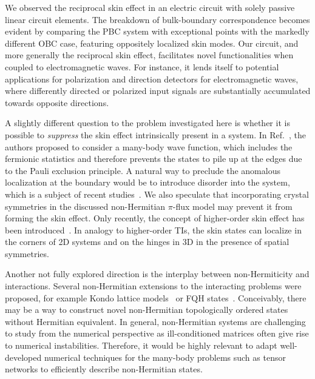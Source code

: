 We observed the reciprocal skin effect in an electric circuit with solely passive linear circuit elements. The breakdown of bulk-boundary correspondence becomes evident by comparing the PBC system with exceptional points with the markedly different OBC case, featuring oppositely localized skin modes. Our circuit, and more generally the reciprocal skin effect, facilitates novel functionalities when coupled to electromagnetic waves. For instance, it lends itself to potential applications for polarization and direction detectors for electromagnetic waves, where differently directed or polarized input signals are substantially accumulated towards opposite directions.

A slightly different question to the problem investigated here is whether it is possible to \emph{suppress} the skin effect intrinsically present in a system. In Ref.~\cite{PhysRevB.101.121109}, the authors proposed to consider a many-body wave function, which includes the fermionic statistics and therefore prevents the states to pile up at the edges due to the Pauli exclusion principle. A natural way to preclude the anomalous localization at the boundary would be to introduce disorder into the system, which is a subject of recent studies~\cite{PhysRevB.100.054301, claes2020skin}. We also speculate that incorporating crystal symmetries in the discussed non-Hermitian $\pi$-flux model may prevent it from forming the skin effect. Only recently, the concept of higher-order skin effect has been introduced~\cite{kawabata2020higherorder, fu2020nonhermitian, okugawa2020secondorder}. In analogy to higher-order TIs, the skin states can localize in the corners of 2D systems and on the hinges in 3D in the presence of spatial symmetries.

Another not fully explored direction is the interplay between non-Hermiticity and interactions. Several non-Hermitian extensions to the interacting problems were proposed, for example Kondo lattice models~\cite{PhysRevB.98.035141, PhysRevLett.121.203001} or FQH states~\cite{Yoshida2019}. Conceivably, there may be a way to construct novel non-Hermitian topologically ordered states without Hermitian equivalent. In general, non-Hermitian systems are challenging to study from the numerical perspective as ill-conditioned matrices often give rise to numerical instabilities. Therefore, it would be highly relevant to adapt well-developed numerical techniques for the many-body problems such as tensor networks to efficiently describe non-Hermitian states.